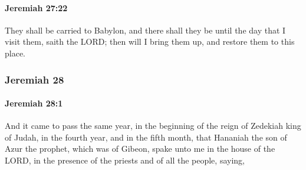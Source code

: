 		\paragraph{Jeremiah 27:22} %
			\label{JEREMIAH-27-22}

			They shall be carried to Babylon, and there shall they be until the day that I visit them, saith the LORD; then will I bring them up, and restore them to this place.

	\subsubsection{Jeremiah 28} %
		\label{JEREMIAH-28}

		\paragraph{Jeremiah 28:1} %
			\label{JEREMIAH-28-1}

			And it came to pass the same year, in the beginning of the reign of Zedekiah king of Judah, in the fourth year, and in the fifth month, that Hananiah the son of Azur the prophet, which was of Gibeon, spake unto me in the house of the LORD, in the presence of the priests and of all the people, saying,

